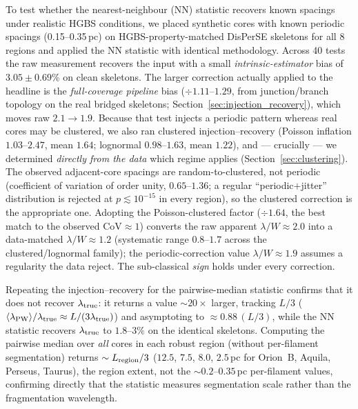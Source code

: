 \documentclass[usenatbib,twoside,twocolumn]{mnras}
\begin{document}
To test whether the nearest-neighbour (NN) statistic recovers known spacings under realistic HGBS conditions, we placed synthetic cores with known periodic spacings (0.15--0.35\,pc) on HGBS-property-matched DisPerSE skeletons for all 8 regions and applied the NN statistic with identical methodology. Across 40 tests the raw measurement recovers the input with a small \emph{intrinsic-estimator} bias of $3.05 \pm 0.69$\% on clean skeletons. The larger correction actually applied to the headline is the \emph{full-coverage pipeline} bias ($\div1.11$--$1.29$, from junction/branch topology on the real bridged skeletons; Section~\ref{sec:injection_recovery}), which moves raw $2.1\to1.9$. Because that test injects a periodic pattern whereas real cores may be clustered, we also ran clustered injection--recovery (Poisson inflation $1.03$--$2.47$, mean $1.64$; lognormal $0.98$--$1.63$, mean $1.22$), and --- crucially --- we determined \emph{directly from the data} which regime applies (Section~\ref{sec:clustering}). The observed adjacent-core spacings are random-to-clustered, not periodic (coefficient of variation of order unity, $0.65$--$1.36$; a regular ``periodic$+$jitter'' distribution is rejected at $p\lesssim10^{-15}$ in every region), so the clustered correction is the appropriate one. Adopting the Poisson-clustered factor ($\div1.64$, the best match to the observed CoV$\approx1$) converts the raw apparent $\lambda/W\approx2.0$ into a data-matched $\lambda/W\approx1.2$ (systematic range $0.8$--$1.7$ across the clustered/lognormal family); the periodic-correction value $\lambda/W\approx1.9$ assumes a regularity the data reject. The sub-classical \emph{sign} holds under every correction.

Repeating the injection--recovery for the pairwise-median statistic confirms that it does not recover $\lambda_{\rm true}$: it returns a value $\sim$$20\times$ larger, tracking $L/3$ ($\langle\lambda_{\rm PW}\rangle/\lambda_{\rm true}\approx L/(3\lambda_{\rm true})$) and asymptoting to $\approx0.88\,(L/3)$, while the NN statistic recovers $\lambda_{\rm true}$ to $1.8$--$3\%$ on the identical skeletons. Computing the pairwise median over \emph{all} cores in each robust region (without per-filament segmentation) returns $\sim L_{\rm region}/3$ ($12.5$, $7.5$, $8.0$, $2.5$\,pc for Orion~B, Aquila, Perseus, Taurus), the region extent, not the $\sim0.2$--$0.35$\,pc per-filament values, confirming directly that the statistic measures segmentation scale rather than the fragmentation wavelength.
\end{document}
